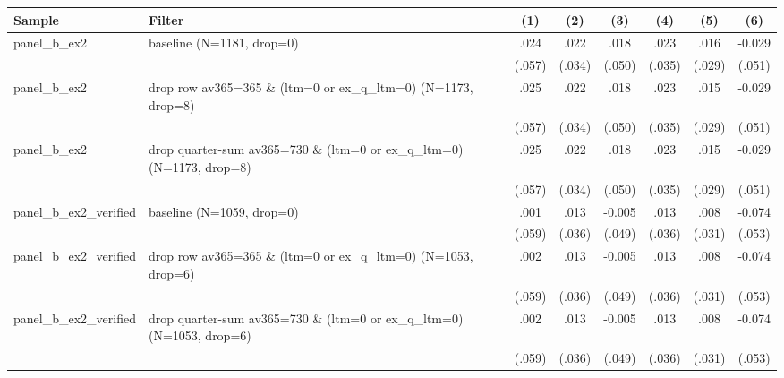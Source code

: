 \begin{tabular}{llcccccc}
\hline
Sample & Filter & (1) & (2) & (3) & (4) & (5) & (6) \\
\hline
panel\_b\_ex2 & baseline (N=1181, drop=0) & .024 & .022 & .018 & .023 & .016 & -0.029
\\
 &  & (.057) & (.034) & (.050) & (.035) & (.029) & (.051)
\\
panel\_b\_ex2 & drop row av365=365 \& (ltm=0 or ex\_q\_ltm=0) (N=1173, drop=8) & .025 & .022 & .018 & .023 & .015 & -0.029
\\
 &  & (.057) & (.034) & (.050) & (.035) & (.029) & (.051)
\\
panel\_b\_ex2 & drop quarter-sum av365=730 \& (ltm=0 or ex\_q\_ltm=0) (N=1173, drop=8) & .025 & .022 & .018 & .023 & .015 & -0.029
\\
 &  & (.057) & (.034) & (.050) & (.035) & (.029) & (.051)
\\
panel\_b\_ex2\_verified & baseline (N=1059, drop=0) & .001 & .013 & -0.005 & .013 & .008 & -0.074
\\
 &  & (.059) & (.036) & (.049) & (.036) & (.031) & (.053)
\\
panel\_b\_ex2\_verified & drop row av365=365 \& (ltm=0 or ex\_q\_ltm=0) (N=1053, drop=6) & .002 & .013 & -0.005 & .013 & .008 & -0.074
\\
 &  & (.059) & (.036) & (.049) & (.036) & (.031) & (.053)
\\
panel\_b\_ex2\_verified & drop quarter-sum av365=730 \& (ltm=0 or ex\_q\_ltm=0) (N=1053, drop=6) & .002 & .013 & -0.005 & .013 & .008 & -0.074
\\
 &  & (.059) & (.036) & (.049) & (.036) & (.031) & (.053)
\\
\hline
\end{tabular}
